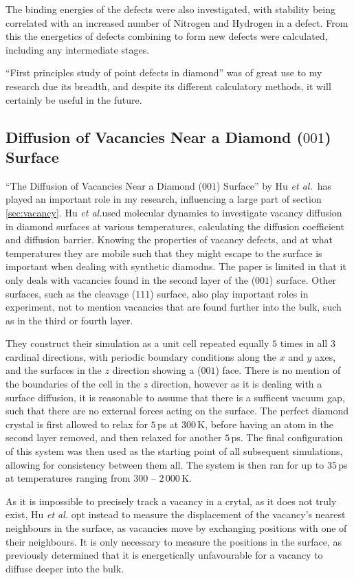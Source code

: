 \documentclass[10pt,a4paper,twocolumn,twoside]{extarticle}
\newcommand{\al}{\emph{et al.}}
\begin{document}
The binding energies of the defects were also investigated, with stability being correlated with an increased number of Nitrogen and Hydrogen in a defect. From this the energetics of defects combining to form new defects were calculated, including any intermediate stages. 

``First principles study of point defects in diamond'' was of great use to my research due its breadth, and despite its different calculatory methods, it will certainly be useful in the future. 

\subsection{Diffusion of Vacancies Near a Diamond ($001$) Surface}
\label{Hu}
``The Diffusion of Vacancies Near a Diamond ($001$) Surface'' by Hu \al~has played an important role in my research, influencing a large part of section \ref{sec:vacancy}. Hu \al used molecular dynamics to investigate vacancy diffusion in diamond surfaces at various temperatures, calculating the diffusion coefficient and diffusion barrier. Knowing the properties of vacancy defects, and at what temperatures they are mobile such that they might escape to the surface is important when dealing with synthetic diamodns. The paper is limited in that it only deals with vacancies found in the second layer of the ($001$) surface. Other surfaces, such as the cleavage ($111$) surface, also play important roles in experiment, not to mention vacancies that are found further into the bulk, such as in the third or fourth layer.

They construct their simulation as a unit cell repeated equally $5$ times in all $3$ cardinal directions, with periodic boundary conditions along the $x$ and $y$ axes, and the surfaces in the $z$ direction showing a ($001$) face. There is no mention of the boundaries of the cell in the $z$ direction, however as it is dealing with a surface diffusion, it is reasonable to assume that there is a sufficent vacuum gap, such that there are no external forces acting on the surface. The perfect diamond crystal is first allowed to relax for $5$\,ps at $300$\,K, before having an atom in the second layer removed, and then relaxed for another $5$\,ps. The final configuration of this system was then used as the starting point of all subsequent simulations, allowing for consistency between them all. The system is then ran for up to $35$\,ps at temperatures ranging from $300$ -- $2\,000$\,K. 

As it is impossible to precisely track a vacancy in a crytal, as it does not truly exist, Hu {\al} opt instead to measure the displacement of the vacancy's nearest neighbours in the surface, as vacancies move by exchanging positions with one of their neighbours. It is only necessary to measure the positions in the surface, as \textcite{Halicioglu} previously determined that it is energetically unfavourable for a vacancy to diffuse deeper into the bulk. 
\end{document}
